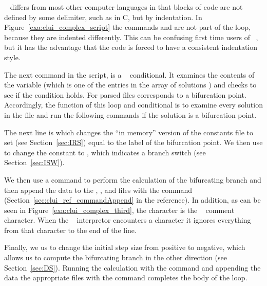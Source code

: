 \python~ differs from most other computer languages in that
blocks of code are not defined by some delimiter, such
as \commandf{\{\}} in {\cal C}, but by indentation.  
In Figure~\ref{exa:clui_complex_script} the commands
 and  are not
part of the loop, because they are indented 
differently.  This can be confusing first time users of \python~,
but it has the advantage that the code
is forced to have a consistent indentation style.

The next command in the script, 
is a \python~ conditional.  
It examines the contents of the
variable  (which is one of the entries
in the array of solutions ) 
and checks to see if the condition
 holds.  
For parsed 
files   corresponds to a bifurcation
point.  Accordingly, the function of this loop and conditional
is to examine every solution in the  file and
run the following commands if the solution is a bifurcation
point.

The next line
is  which changes
the ``in memory'' version of the \AUTOc constants file to 
set  (see Section~\ref{sec:IRS}) equal to the label
of the bifurcation point. We then use  to change
the \AUTOc constant  to , which
indicates a branch switch (see Section~\ref{sec:ISW}).

We then use a  command to perform the
calculation of the bifurcating branch and then append the
data to the , , and
 files with the 
command (Section~\ref{sec:clui_ref_commandAppend} in the reference).
In addition, as can be seen in Figure~\ref{exa:clui_complex_third},
the \commandf{\#} character is the \python~ comment character.
When the \python~ interpretor encounters a \commandf{\#} character
it ignores everything from that character to the end of the line.

Finally, we us  to change the
\AUTOc initial step size from positive to negative, which allows
us to compute the bifurcating branch in the other direction
(see Section~\ref{sec:DS}).  Running the \AUTOc calculation
with the  command and appending the
data the appropriate files with the  command
completes the body of the loop.

